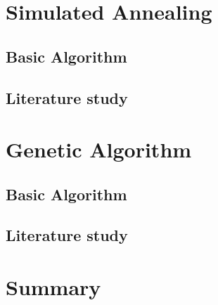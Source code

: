 \section{Simulated Annealing}

\subsection{Basic Algorithm}

\subsection{Literature study}

\section{Genetic Algorithm}

\subsection{Basic Algorithm}

\subsection{Literature study}
\section {Summary}
